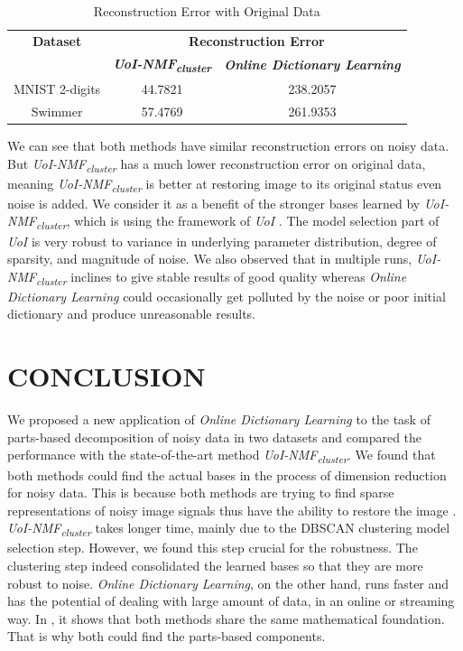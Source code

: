 \documentclass[conference]{IEEEtran}
\begin{document}
\begin{table}[htbp]
\caption{Reconstruction Error with Original Data}
\begin{center}
\begin{tabular}{|c|c|c|}
\hline
\textbf{Dataset}&\multicolumn{2}{|c|}{\textbf{Reconstruction Error}} \\
\cline{2-3} 
 & \textbf{\textit{UoI-NMF\textsubscript{cluster}}}& \textbf{\textit{Online Dictionary Learning}} \\
\hline
MNIST 2-digits & 44.7821 & 238.2057 \\
\hline
Swimmer & 57.4769 & 261.9353 \\
\hline
\end{tabular}
\label{tab3}
\end{center}
\end{table}

We can see that both methods have similar reconstruction errors on noisy data. But \textit{UoI-NMF\textsubscript{cluster}} has a much lower reconstruction error on original data, meaning \textit{UoI-NMF\textsubscript{cluster}} is better at restoring image to its original status even noise is added. We consider it as a benefit of the stronger bases learned by \textit{UoI-NMF\textsubscript{cluster}}, which is using the framework of \textit{UoI} \cite{b13}. The model selection part of \textit{UoI} is very robust to variance in underlying parameter distribution, degree of sparsity, and magnitude of noise. We also observed that in multiple runs, \textit{UoI-NMF\textsubscript{cluster}} inclines to give stable results of good quality whereas \textit{Online Dictionary Learning} could occasionally get polluted by the noise or poor initial dictionary and produce unreasonable results.


\section{CONCLUSION}

We proposed a new application of \textit{Online Dictionary Learning} to the task of parts-based decomposition of noisy data in two datasets and compared the performance with the state-of-the-art method \textit{UoI-NMF\textsubscript{cluster}}. We found that both methods could find the actual bases in the process of dimension reduction for noisy data. This is because both methods are trying to find sparse representations of noisy image signals thus have the ability to restore the image \cite{b14}. \textit{UoI-NMF\textsubscript{cluster}} takes longer time, mainly due to the DBSCAN clustering model selection step. However, we found this step crucial for the robustness. The clustering step indeed consolidated the learned bases so that they are more robust to noise. \textit{Online Dictionary Learning}, on the other hand, runs faster and has the potential of dealing with large amount of data, in an online or streaming way. In \cite{b15}, it shows that both methods share the same mathematical foundation. That is why both could find the parts-based components.
\end{document}
